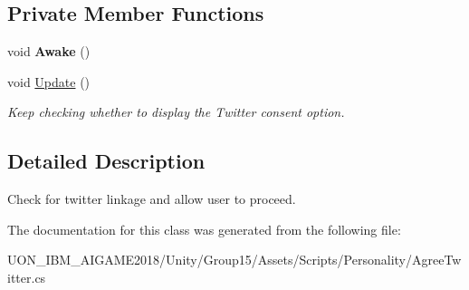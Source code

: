 \subsection*{Private Member Functions}
\begin{DoxyCompactItemize}
\item 
\mbox{\label{class_agree_twitter_ac14f26c38898b7e0afec3f3d5310e756}} 
void {\bfseries Awake} ()
\item 
\mbox{\label{class_agree_twitter_a325b77b472b59d10711f6c61e22beecf}} 
void \mbox{\hyperlink{class_agree_twitter_a325b77b472b59d10711f6c61e22beecf}{Update}} ()
\begin{DoxyCompactList}\small\item\em Keep checking whether to display the Twitter consent option. \end{DoxyCompactList}\end{DoxyCompactItemize}


\subsection{Detailed Description}
Check for twitter linkage and allow user to proceed. 

The documentation for this class was generated from the following file\+:\begin{DoxyCompactItemize}
\item 
U\+O\+N\+\_\+\+I\+B\+M\+\_\+\+A\+I\+G\+A\+M\+E2018/\+Unity/\+Group15/\+Assets/\+Scripts/\+Personality/Agree\+Twitter.\+cs\end{DoxyCompactItemize}
